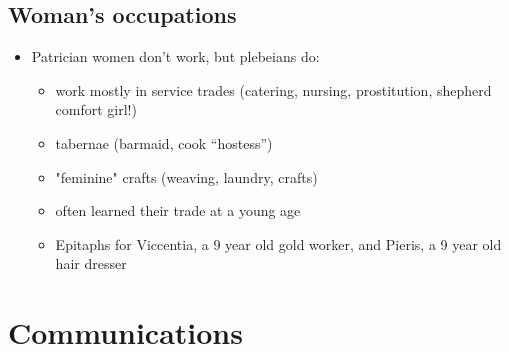 \documentclass[12pt, twoside]{article}
\begin{document}
\subsection{Woman's occupations}
\begin{itemize}
\item Patrician women don’t work, but plebeians do:
	\begin{itemize}
	\item work mostly in service trades (catering, nursing, prostitution, shepherd comfort girl!)
	\item tabernae (barmaid, cook “hostess”)
	\item "feminine" crafts (weaving, laundry, crafts)
	\item often learned their trade at a young age
	\item Epitaphs for Viccentia, a 9 year old gold worker, and Pieris, a 9 year old hair dresser
	\end{itemize}
\end{itemize}

\section{Communications}
\end{document}

